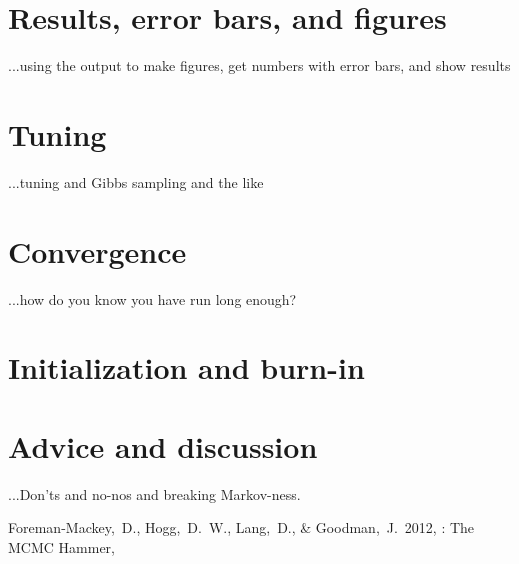 \documentclass[12pt,twoside,pdftex]{article}
\begin{document}
\section{Results, error bars, and figures}

...using the output to make figures, get numbers with error bars, and show results

\section{Tuning}

...tuning and Gibbs sampling and the like

\section{Convergence}

...how do you know you have run long enough?

\section{Initialization and burn-in}

\section{Advice and discussion}

...Don'ts and no-nos and breaking Markov-ness.


\clearpage
{}\theendnotes

\clearpage
\begin{thebibliography}{}
  Foreman-Mackey,~D., Hogg,~D.~W., Lang,~D., \& Goodman,~J.\ 2012,
  : The MCMC Hammer,
\end{thebibliography}
\end{document}

